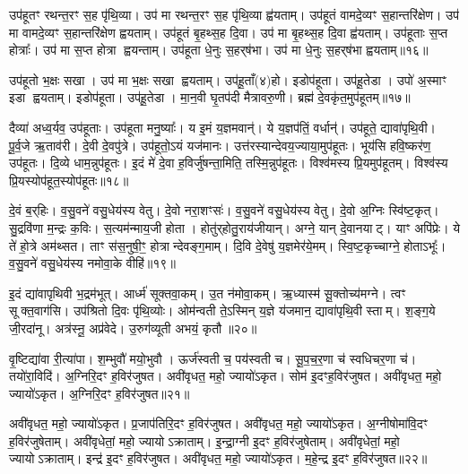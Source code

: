 उप॑हूतꣳ रथन्त॒रꣳ स॒ह पृ॑थि॒व्या।
उप॑ मा रथन्त॒रꣳ स॒ह पृ॑थि॒व्या ह्व॑यताम्।
उप॑हूतं वामदे॒व्यꣳ स॒हान्तरि॑क्षेण।
उप॑ मा वामदे॒व्यꣳ स॒हान्तरि॑क्षेण ह्वयताम्।
उप॑हूतं बृ॒हथ्स॒ह दि॒वा।
उप॑ मा बृ॒हथ्स॒ह दि॒वा ह्व॑यताम्।
उप॑हूताः स॒प्त होत्राः᳚।
उप॑ मा स॒प्त होत्रा ह्वयन्ताम्।
उप॑हूता धे॒नुः स॒हर्‌\mbox{}ष॑भा।
उप॑ मा धे॒नुः स॒हर्‌\mbox{}ष॑भा ह्वयताम्॥१६॥

उप॑हूतो भ॒क्षः सखा।
उप॑ मा भ॒क्षः सखा ह्वयताम्।
उप॑हू॒ताँ(४)हो।
इडोप॑हूता।
उप॑हू॒तेडा।
उपो॑ अ॒स्माꣳ इडा ह्वयताम्।
इडोप॑हूता।
उप॑हू॒तेडा।
मा॒न॒वी घृ॒तप॑दी मैत्रावरु॒णी।
ब्रह्म॑ दे॒वकृ॑त॒मुप॑हूतम्॥१७॥

दैव्या॑ अध्व॒र्यव॒ उप॑हूताः।
उप॑हूता मनु॒ष्याः᳚।
य इ॒मं य॒ज्ञमवान्॑।
ये य॒ज्ञप॑तिं॒ वर्धान्॑।
उप॑हूते॒ द्यावा॑पृथि॒वी।
पू॒र्व॒जे ऋ॒ताव॑री।
दे॒वी दे॒वपु॑त्रे।
उप॑हूतो॒ऽयं यज॑मानः।
उत्त॑रस्यान्देवय॒ज्याया॒मुप॑हूतः।
भूय॑सि हवि॒ष्कर॑ण॒ उप॑हूतः।
दि॒व्ये धाम॒न्नुप॑हूतः।
इ॒दं मे॑ दे॒वा ह॒विर्जु॑षन्ता॒मिति॒ तस्मि॒न्नुप॑हूतः।
विश्व॑मस्य प्रि॒यमुप॑हूतम्।
विश्व॑स्य प्रि॒यस्योप॑हूत॒स्योप॑हूतः॥१८॥

दे॒वं ब॒र्‌\mbox{}हिः।
व॒सु॒वने॑ वसु॒धेय॑स्य वेतु।
दे॒वो नरा॒शꣳसः॑।
व॒सु॒वने॑ वसु॒धेय॑स्य वेतु।
दे॒वो अ॒ग्निः स्वि॑ष्ट॒कृत्।
सु॒द्रवि॑णा म॒न्द्रः क॒विः।
स॒त्यम॑न्माय॒जी होता।
होतु॑र्‌\mbox{}होतु॒राय॑जीयान्।
अग्ने॒ यान् दे॒वानयाट्।
याꣳ अपि॑प्रेः।
ये ते॑ हो॒त्रे अम॑थ्सत।
ताꣳ स॑स॒नुषी॒ꣳ॒ होत्रान्देवङ्ग॒माम्।
दि॒वि दे॒वेषु॑ य॒ज्ञमेर॑ये॒मम्।
स्वि॒ष्ट॒कृच्चाग्ने॒ होता\-ऽभूः᳚।
व॒सु॒वने॑ वसु॒धेय॑स्य नमोवा॒के वीहि॑॥१९॥\anuvakamend[अपि॑प्रेः॒ पञ्च॑ च]

इ॒दं द्या॑वापृथिवी भ॒द्रम॑भूत्।
आर्ध्म॑ सूक्तवा॒कम्।
उ॒त न॑मोवा॒कम्।
ऋ॒ध्यास्म॑ सू॒क्तोच्य॑मग्ने।
त्वꣳ सूक्त॒वाग॑सि।
उप॑श्रितो दि॒वः पृ॑थि॒व्योः।
ओम॑न्वती ते॒\-ऽस्मिन् य॒ज्ञे य॑जमान॒ द्यावा॑पृथि॒वी स्ताम्।
श॒ङ्ग॒ये जी॒रदा॑नू।
अत्र॑स्नू॒ अप्र॑वेदे।
उ॒रुग॑व्यूती अभयं॒ कृतौ॥२०॥

वृ॒ष्टिद्या॑वा री॒त्या॑पा।
श॒म्भुवौ॑ मयो॒भुवौ।
ऊर्ज॑स्वती च॒ पय॑स्वती च।
सू॒प॒च॒र॒णा च॑ स्वधिचर॒णा च॑।
तयो॑रा॒विदि॑।
अ॒ग्निरि॒दꣳ ह॒विर॑जुषत।
अवी॑वृधत॒ महो॒ ज्यायो॑ऽकृत।
सोम॑ इ॒दꣳह॒विर॑जुषत।
अवी॑वृधत॒ महो॒ ज्यायो॑ऽकृत।
अ॒ग्निरि॒दꣳ ह॒विर॑जुषत॥२१॥

अवी॑वृधत॒ महो॒ ज्यायो॑ऽकृत।
प्र॒जाप॑तिरि॒दꣳ ह॒विर॑जुषत।
अवी॑वृधत॒ महो॒ ज्यायो॑ऽकृत।
अ॒ग्नीषोमा॑वि॒दꣳ ह॒विर॑जुषेताम्।
अवी॑वृधेतां॒ महो॒ ज्यायो\-ऽक्राताम्।
इ॒न्द्रा॒ग्नी इ॒दꣳ ह॒विर॑जुषेताम्।
अवी॑वृधेतां॒ महो॒ ज्यायो\-ऽक्राताम्।
इन्द्र॑ इ॒दꣳ ह॒विर॑जुषत।
अवी॑वृधत॒ महो॒ ज्यायो॑ऽकृत।
म॒हे॒न्द्र इ॒दꣳ ह॒विर॑जुषत॥२२॥

